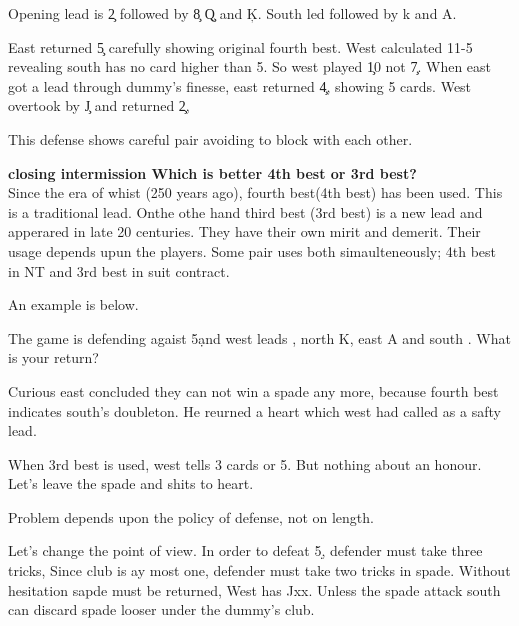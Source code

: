 Opening lead is \c 2 followed by \c 8 \c Q and \c K.
South led  followed by  \s k and \s A.

East returned \c 5 carefully showing original fourth best.
West calculated 11-5 revealing south has no card higher than
5. So west played \c 10 not \c 7. When east got a lead  
through dummy's finesse, east returned \c 4, showing 5 cards.
West overtook by \c J and returned \c 2,

This defense shows careful pair avoiding to block 
with each other.

\vspace{0.5cm}

{\bf closing intermission  Which is better 4th best or 3rd best?}\\

Since the era of whist (250 years ago), fourth best(4th best)
 has been used.
This is a traditional lead. Onthe othe hand third best (3rd best)
is a new lead and apperared in late 20 centuries.
They have their own mirit and demerit. Their usage depends upun the
players. Some pair uses both simaulteneously; 4th best in NT and 
3rd best in suit contract.

An example is below.\\

\begin{quote}
%
  {}%
  {\hand{-}{-}{-}{-}}
  {}%
 {\hand{-}{-}{-}{-}}
\end{quote}

The game is defending agaist 5\d and west leads ,
north \s K, east \s A and south . What is your return?

Curious east concluded they can not win a spade any more,
because fourth best indicates south's doubleton. He reurned
a heart which west had called as a safty lead.

When 3rd best is used, west tells 3 cards or 5. But
nothing about an honour. Let's leave the spade and shits to 
heart.

Problem depends upon the policy of defense, not on length.

Let's change the point of view. In order to defeat 5\d ,
defender must take three tricks, Since club is ay most one,
defender must take two tricks in spade. Without hesitation
sapde must be returned, West has Jxx. Unless the spade attack
south can discard spade looser under the dummy's club.

